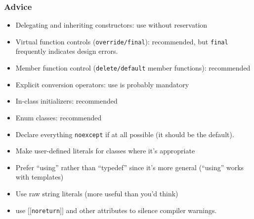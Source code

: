 \begin{frame}[fragile,t]
\frametitle{Advice}
\begin{itemize}[<+->]
\item Delegating and inheriting constructors: use without reservation
\item Virtual function controls (\texttt{override/final}):
  recommended, but \texttt{final} frequently indicates design errors.
\item Member function control (\texttt{delete/default} member
  functions): recommended
\item Explicit conversion operators:  use is probably mandatory
\item In-class initializers: recommended
\item Enum classes: recommended
\item Declare everything \texttt{noexcept} if at all possible (it
  should be the default).
\item Make user-defined literals for classes where it's appropriate
\item Prefer ``using'' rather than ``typedef'' since it's more general
  (``using'' works with templates)
\item Use raw string literals (more useful than you'd think)
\item use $[[$\texttt{noreturn}$]]$ and other attributes to silence
  compiler warnings.
\end{itemize}
\end{frame}

